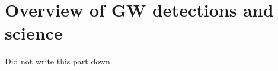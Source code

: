 \documentclass[main.tex]{subfiles}
\begin{document}
\section{Overview of GW detections and science}


Did not write this part down. 
\end{document}
